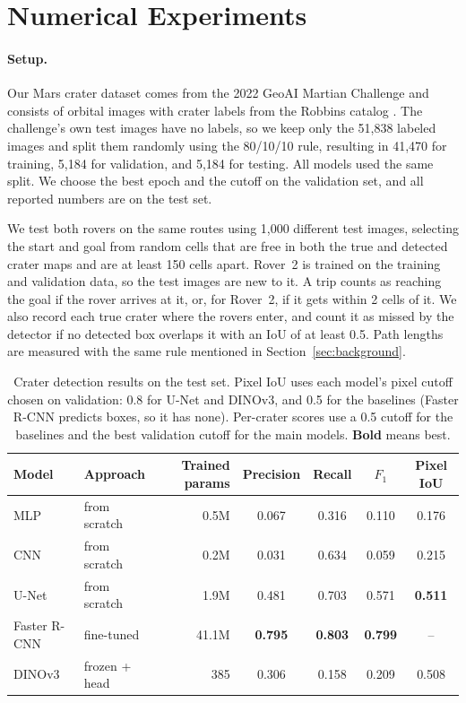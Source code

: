 \documentclass{article} %
\begin{document}
\vspace{-10pt}
\section{Numerical Experiments}
\label{sec:numerical_experiments}

\paragraph{Setup.}
Our Mars crater dataset comes from the 2022 GeoAI Martian Challenge \cite{hsu2021} and consists of orbital images with crater labels from the Robbins catalog \cite{robbins2012}. The challenge's own test images have no labels, so we keep only the 51,838 labeled images and split them randomly using the 80/10/10 rule, resulting in 41,470 for training, 5,184 for validation, and 5,184 for testing. All models used the same split. We choose the best epoch and the cutoff on the validation set, and all reported numbers are on the test set.

We test both rovers on the same routes using 1,000 different test images, selecting the start and goal from random cells that are free in both the true and detected crater maps and are at least 150 cells apart. Rover~2 is trained on the training and validation data, so the test images are new to it. A trip counts as reaching the goal if the rover arrives at it, or, for Rover~2, if it gets within 2 cells of it. We also record each true crater where the rovers enter, and count it as missed by the detector if no detected box overlaps it with an IoU of at least 0.5. Path lengths are measured with the same rule mentioned in Section~\ref{sec:background}.

\begin{table}[tb]
  \centering
  \begin{tabular}{llrcccc}
    \toprule
    Model & Approach & Trained params & Precision & Recall & $F_1$ & Pixel IoU \\
    \midrule
    MLP & from scratch & 0.5M & 0.067 & 0.316 & 0.110 & 0.176 \\
    CNN & from scratch & 0.2M & 0.031 & 0.634 & 0.059 & 0.215 \\
    \midrule
    U-Net & from scratch & 1.9M & 0.481 & 0.703 & 0.571 & \textbf{0.511} \\
    Faster R-CNN & fine-tuned & 41.1M & \textbf{0.795} & \textbf{0.803} & \textbf{0.799} & -- \\
    DINOv3 & frozen + head & 385 & 0.306 & 0.158 & 0.209 & 0.508 \\
    \bottomrule
  \end{tabular}
  \caption{Crater detection results on the test set. Pixel IoU uses each model's pixel cutoff chosen on validation: 0.8 for U-Net and DINOv3, and 0.5 for the baselines (Faster R-CNN predicts boxes, so it has none). Per-crater scores use a 0.5 cutoff for the baselines and the best validation cutoff for the main models. \textbf{Bold} means best.}
  \label{tab:detectors}
\end{table}
\end{document}
